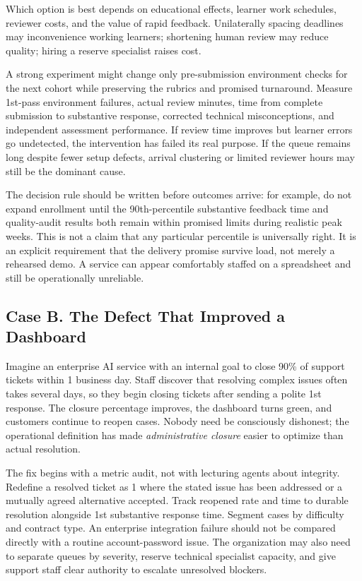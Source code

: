 Which option is best depends on educational effects, learner work schedules, reviewer costs, and the value of rapid feedback. Unilaterally spacing deadlines may inconvenience working learners; shortening human review may reduce quality; hiring a reserve specialist raises cost.

A strong experiment might change only pre-submission environment checks for the next cohort while preserving the rubrics and promised turnaround. Measure 1st-pass environment failures, actual review minutes, time from complete submission to substantive response, corrected technical misconceptions, and independent assessment performance. If review time improves but learner errors go undetected, the intervention has failed its real purpose. If the queue remains long despite fewer setup defects, arrival clustering or limited reviewer hours may still be the dominant cause.

The decision rule should be written before outcomes arrive: for example, do not expand enrollment until the 90th-percentile substantive feedback time and quality-audit results both remain within promised limits during realistic peak weeks. This is not a claim that any particular percentile is universally right. It is an explicit requirement that the delivery promise survive load, not merely a rehearsed demo. A service can appear comfortably staffed on a spreadsheet and still be operationally unreliable.

\subsection*{Case B. The Defect That Improved a Dashboard}

Imagine an enterprise AI service with an internal goal to close 90\% of support tickets within 1 business day. Staff discover that resolving complex issues often takes several days, so they begin closing tickets after sending a polite 1st response. The closure percentage improves, the dashboard turns green, and customers continue to reopen cases. Nobody need be consciously dishonest; the operational definition has made \textit{administrative closure} easier to optimize than actual resolution.

The fix begins with a metric audit, not with lecturing agents about integrity. Redefine a resolved ticket as 1 where the stated issue has been addressed or a mutually agreed alternative accepted. Track reopened rate and time to durable resolution alongside 1st substantive response time. Segment cases by difficulty and contract type. An enterprise integration failure should not be compared directly with a routine account-password issue. The organization may also need to separate queues by severity, reserve technical specialist capacity, and give support staff clear authority to escalate unresolved blockers.

